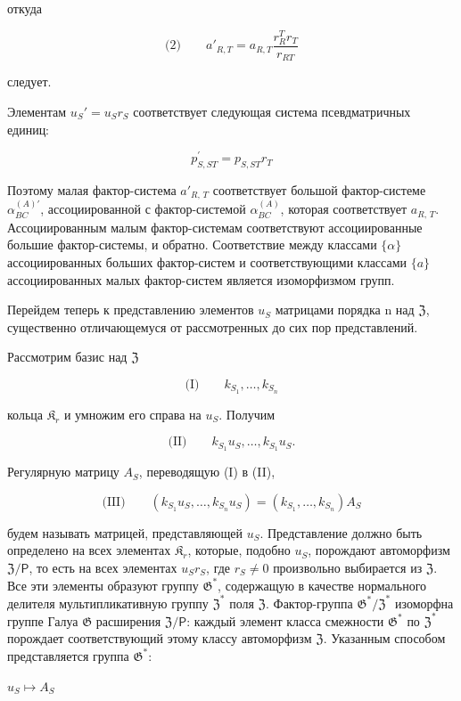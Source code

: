\documentclass[11pt]{article}
\begin{document}
откуда

\[
\text{(2)}\qquad a'_{R,T}=a_{R,T}\frac{r_R^T r_T}{r_{RT}}
\]

следует.

Элементам \(u_S' = u_S r_S\) соответствует следующая система псевдматричных единиц:

\[p_{S,ST}^{\prime}=p_{S,ST}r_{T}\]

Поэтому малая фактор-система \(a'_{R,\,T}\) соответствует большой фактор-системе \(\alpha^{(A)\prime}_{BC}\), ассоциированной с фактор-системой \(\alpha^{(A)}_{BC}\), которая соответствует \(a_{R,\,T}\). Ассоциированным малым фактор-системам соответствуют ассоциированные большие фактор-системы, и обратно. Соответствие между классами \(\{\alpha\}\) ассоциированных больших фактор-систем и соответствующими классами \(\{a\}\) ассоциированных малых фактор-систем является изоморфизмом групп.

Перейдем теперь к представлению элементов \(u_S\) матрицами порядка n над \(\mathfrak{Z}\), существенно отличающемуся от рассмотренных до сих пор представлений.

Рассмотрим базис над \(\mathfrak Z\)

\[
\text{(I)}\qquad k_{S_1}, \ldots, k_{S_n}
\]

кольца \(\mathfrak K_r\) и умножим его справа на \(u_S\). Получим

\[
\text{(II)}\qquad k_{S_1}u_S, \ldots, k_{S_1}u_S.
\]

Регулярную матрицу \(A_S\), переводящую (I) в (II),

\[
\text{(III)}\qquad (k_{S_1}u_S, \ldots, k_{S_n}u_S) = (k_{S_1}, \ldots, k_{S_n})A_S
\]

будем называть матрицей, представляющей \(u_S\). Представление должно быть определено на всех элементах \(\mathfrak K_{r}\), которые, подобно \(u_S\), порождают автоморфизм \(\mathfrak Z/\mathsf{P}\), то есть на всех элементах \(u_Sr_S\), где \(r_S \neq 0\) произвольно выбирается из \(\mathfrak Z\). Все эти элементы образуют группу \(\mathfrak G^*\), содержащую в качестве нормального делителя мультипликативную группу \(\mathfrak Z^*\) поля \(\mathfrak Z\). Фактор-группа \(\mathfrak G^*/\mathfrak Z^*\) изоморфна группе Галуа \(\mathfrak G\) расширения \(\mathfrak Z/\mathsf{P}\): каждый элемент класса смежности \(\mathfrak G^*\) по \(\mathfrak Z^*\) порождает соответствующий этому классу автоморфизм \(\mathfrak Z\). Указанным способом представляется группа \(\mathfrak G^*\):

\(u_S \mapsto A_S\)
\end{document}
